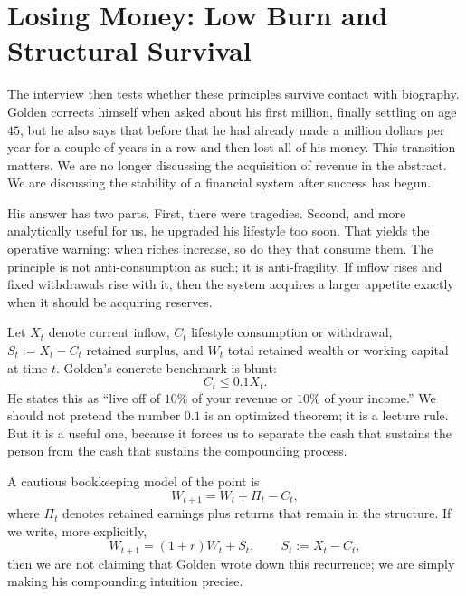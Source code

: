 \section{Losing Money: Low Burn and Structural Survival}

The interview then tests whether these principles survive contact with biography. Golden corrects himself when asked about his first million, finally settling on age \(45\), but he also says that before that he had already made a million dollars per year for a couple of years in a row and then lost all of his money. This transition matters. We are no longer discussing the acquisition of revenue in the abstract. We are discussing the stability of a financial system after success has begun.

His answer has two parts. First, there were tragedies. Second, and more analytically useful for us, he upgraded his lifestyle too soon. That yields the operative warning: when riches increase, so do they that consume them. The principle is not anti-consumption as such; it is anti-fragility. If inflow rises and fixed withdrawals rise with it, then the system acquires a larger appetite exactly when it should be acquiring reserves.

Let \(X_t\) denote current inflow, \(C_t\) lifestyle consumption or withdrawal, \(S_t:=X_t-C_t\) retained surplus, and \(W_t\) total retained wealth or working capital at time \(t\). Golden's concrete benchmark is blunt:
\begin{equation}
C_t \le 0.1X_t.
\end{equation}
He states this as ``live off of \(10\%\) of your revenue or \(10\%\) of your income.'' We should not pretend the number \(0.1\) is an optimized theorem; it is a lecture rule. But it is a useful one, because it forces us to separate the cash that sustains the person from the cash that sustains the compounding process.

A cautious bookkeeping model of the point is
\begin{equation}
W_{t+1}=W_t+\Pi_t-C_t,
\end{equation}
where \(\Pi_t\) denotes retained earnings plus returns that remain in the structure. If we write, more explicitly,
\begin{equation}
W_{t+1}=(1+r)W_t+S_t,\qquad S_t:=X_t-C_t,
\end{equation}
then we are not claiming that Golden wrote down this recurrence; we are simply making his compounding intuition precise.

